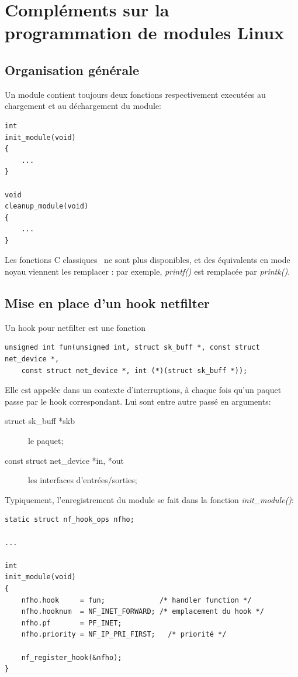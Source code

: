 \documentclass[a4paper]{article}
\begin{document}
\newpage
\appendix

\section{Compléments sur la programmation de modules Linux}
\subsection{Organisation générale}
Un module contient toujours deux fonctions respectivement executées
au chargement et au déchargement du module:
\begin{verbatim}
int
init_module(void)
{
    ...
}

void
cleanup_module(void)
{
    ...
}
\end{verbatim}

Les fonctions C \og classiques \fg\ ne sont plus disponibles, et
des équivalents en mode noyau viennent les remplacer : par exemple,
\textit{printf()} est remplacée par \textit{printk()}.

\subsection{Mise en place d'un hook netfilter}
Un hook pour netfilter est une fonction
\begin{verbatim}
unsigned int fun(unsigned int, struct sk_buff *, const struct net_device *,
	const struct net_device *, int (*)(struct sk_buff *));
\end{verbatim}

Elle est appelée dans un contexte d'interruptions, à chaque
fois qu'un paquet passe par le hook correspondant. Lui sont entre
autre passé en arguments:
\begin{description}
	\item[struct sk\_buff *skb] le paquet;
	\item[const struct net\_device *in, *out] les interfaces d'entrées/sorties;
\end{description}

Typiquement, l'enregistrement du module se fait dans la fonction
\textit{init\_module()}:
\begin{verbatim}
static struct nf_hook_ops nfho;

...

int
init_module(void)
{
    nfho.hook     = fun;             /* handler function */
    nfho.hooknum  = NF_INET_FORWARD; /* emplacement du hook */
    nfho.pf       = PF_INET;
    nfho.priority = NF_IP_PRI_FIRST;   /* priorité */

    nf_register_hook(&nfho);
}
\end{verbatim}
\end{document}
